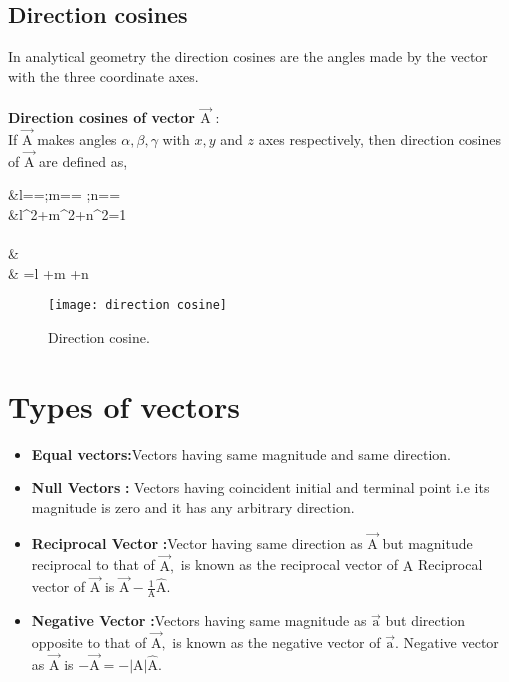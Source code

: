   \subsection{Direction cosines}
In analytical geometry the direction cosines are the angles made by the vector with  the three coordinate axes.\\\\\textbf{Direction cosines of vector $\vec{\mathrm A}$} :
\\\newline If $\vec{\mathrm A}$ makes angles $\alpha, \beta, \gamma$ with $x, y$ and $z$ axes respectively, then direction cosines of $\vec{\mathrm A}$ are defined as,
\begin{minipage}{0.6\textwidth}
	\begin{flalign*}
	&l=\cos \alpha=\quad ;\quad  m=\cos \beta= \quad ;\quad  n=\cos \gamma= \\  &l^{2}+m^{2}+n^{2}=1\\\\
	& \\
	& =l +m +n \\
	\end{flalign*}
\end{minipage}
\begin{minipage}{0.4\textwidth}
	\begin{figure}[H]
		\centering
		\texttt{[image: direction cosine]}\caption{Direction cosine.}
	\end{figure}
\end{minipage}
\section{Types of vectors}
\begin{itemize}
	\item \textbf{{Equal vectors}}\hspace{0.74cm}\textbf{:}\quad Vectors having same magnitude and same direction.
	\item \textbf{Null Vectors }\hspace{0.82cm}\textbf{:} \quad Vectors having coincident initial and terminal point i.e its magnitude is zero and it has any arbitrary direction.
	\item \textbf{Reciprocal Vector }\textbf{:}\quad Vector having same direction as $\vec{\mathrm  A}$ but magnitude reciprocal to that of $\vec{\mathrm A},$ is known as the reciprocal vector of $\mathrm A$ Reciprocal vector of $\vec{\mathrm A}$ is $\vec{\mathrm A}-\frac{1}{\mathrm A} \hat{\mathrm A}$.
	\item \textbf{Negative Vector}\hspace{0.3cm} \textbf{:}\quad Vectors having same magnitude as $\vec{\mathrm a}$ but direction opposite to that of $\vec{\mathrm A},$ is known
	as the negative vector of $\vec{\mathrm a} .$ Negative vector as $\vec{\mathrm A}$ is $-\vec{\mathrm A}=-|\mathrm A| \hat{\mathrm A}$.
\end{itemize}
